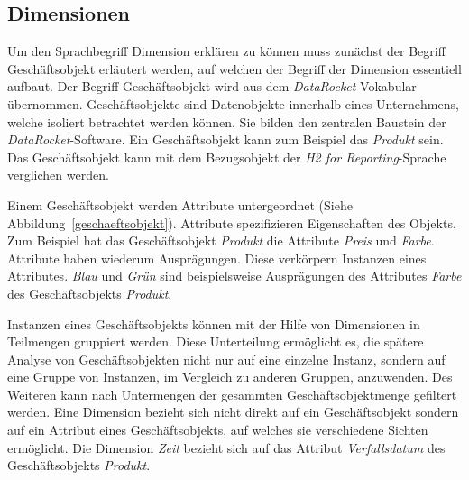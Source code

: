\documentclass[
  language=german, %
  type=bachelor%
]{isthesis}
\begin{document}
\begin{content}
  \begin{figure}[caption={Metamodell der \textit{DataFurnace}-Sprache}, label={fig:language_spec-erm}]
    \resizebox{\columnwidth}{!}{}
  \end{figure}

  \subsection{Dimensionen}\label{subsec:dimension}

	Um den Sprachbegriff Dimension erklären zu können muss zunächst der Begriff
	Geschäftsobjekt erläutert werden, auf welchen der Begriff der Dimension
	essentiell aufbaut. Der Begriff Geschäftsobjekt wird aus dem
	\textit{DataRocket}-Vokabular übernommen. Geschäftsobjekte sind Datenobjekte
	innerhalb eines Unternehmens, welche isoliert betrachtet werden können. Sie
	bilden den zentralen Baustein der \textit{DataRocket}-Software. Ein
	Geschäftsobjekt kann zum Beispiel das \textit{Produkt} sein.  Das
	Geschäftsobjekt kann mit dem Bezugsobjekt der \textit{H2 for
	Reporting}-Sprache verglichen werden.

  \begin{figure}[caption={\acrshort{ERM} der Geschäftsobjektteilsprache}, label={geschaeftsobjekt}]
    \resizebox{200px}{!}{}
  \end{figure}

  Einem Geschäftsobjekt werden Attribute untergeordnet (Siehe
  Abbildung~\ref{geschaeftsobjekt}). Attribute spezifizieren Eigenschaften des
  Objekts. Zum Beispiel hat das Geschäftsobjekt \textit{Produkt} die Attribute
  \textit{Preis} und \textit{Farbe}. Attribute haben wiederum Ausprägungen.
  Diese verkörpern Instanzen eines Attributes. \textit{Blau} und \textit{Grün}
  sind beispielsweise Ausprägungen des Attributes \textit{Farbe} des
  Geschäftsobjekts \textit{Produkt}.

	Instanzen eines Geschäftsobjekts können mit der Hilfe von Dimensionen in
	Teilmengen gruppiert werden. Diese Unterteilung ermöglicht es, die spätere
	Analyse von Geschäftsobjekten nicht nur auf eine einzelne Instanz, sondern
	auf eine Gruppe von Instanzen, \ggf{} im Vergleich zu anderen Gruppen,
	anzuwenden. Des Weiteren kann nach Untermengen der gesammten
	Geschäftsobjektmenge gefiltert werden.  Eine Dimension bezieht sich nicht
	direkt auf ein Geschäftsobjekt sondern auf ein Attribut eines
	Geschäftsobjekts, auf welches sie verschiedene Sichten ermöglicht. Die
	Dimension \textit{Zeit} bezieht sich \zB{} auf das Attribut
	\textit{Verfallsdatum} des Geschäftsobjekts \textit{Produkt}. 


\end{content}
\end{document}
